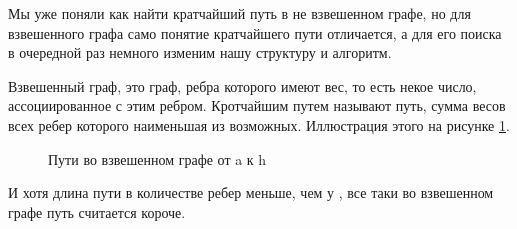 \documentclass[../article.tex]{subfiles}
\begin{document}
{Мы уже поняли как найти кратчайший путь в не взвешенном графе, но для взвешенного графа само понятие кратчайшего пути отличается, а для его поиска в очередной раз немного изменим нашу структуру и алгоритм.}

Взвешенный граф, это граф, ребра которого имеют вес, то есть некое число, ассоциированное с этим ребром. Кротчайшим путем называют путь, сумма весов всех ребер которого наименьшая из возможных. Иллюстрация этого на рисунке \ref{fig:compareWeightedPaths}.

\begin{figure}
    \caption{Пути во взвешенном графе от {\firacodebold a} к {\firacodebold h}}
    \label{fig:compareWeightedPaths}
\end{figure}

И хотя длина пути {\firacodebold [a, h]} в количестве ребер меньше, чем у {\firacodebold [a, f, g, h]}, все таки во взвешенном графе путь {\firacodebold [a, f, g, h]} считается короче.
\end{document}
